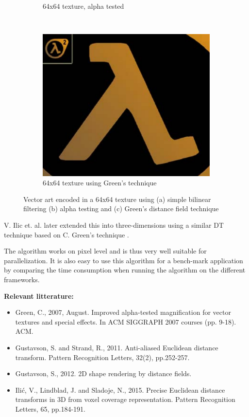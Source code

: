 \documentclass{article}
\begin{document}
\begin{figure}[!h]
\begin{subfigure}[b]{0.3\textwidth}
        \caption{64x64 texture, alpha tested}
        \label{fig:valveA}
    \end{subfigure}
    ~ 
    \begin{subfigure}[b]{0.3\textwidth}
        \includegraphics[width=\textwidth]{Figs/ValveGreensTechnique.png}
        \caption{64x64 texture using Green's technique}
        \label{fig:mouse}
    \end{subfigure}
    \caption{Vector art encoded in a 64x64 texture using (a) simple bilinear filtering (b) alpha testing and (c) Green's distance field technique}\label{fig:animals}
    \label{fig:valve}
\end{figure}

V. Ilic et. al. later extended this into three-dimensions using a similar DT technique based on C. Green's technique \cite{ilic2015precise}. 

The algorithm works on pixel level and is thus very well suitable for parallelization. It is also easy to use this algorithm for a bench-mark application by comparing the time consumption when running the algorithm on the different frameworks.


\vspace{5mm}
\noindent \textbf{Relevant litterature:}
\begin{itemize}
    \item Green, C., 2007, August. Improved alpha-tested magnification for vector textures and special effects. In ACM SIGGRAPH 2007 courses (pp. 9-18). ACM. \cite{green2007improved}
    \item Gustavson, S. and Strand, R., 2011. Anti-aliased Euclidean distance transform. Pattern Recognition Letters, 32(2), pp.252-257. \cite{gustavson2011anti}
    \item Gustavson, S., 2012. 2D shape rendering by distance fields. \cite{gustavson20122d}
    \item Ilić, V., Lindblad, J. and Sladoje, N., 2015. Precise Euclidean distance transforms in 3D from voxel coverage representation. Pattern Recognition Letters, 65, pp.184-191. \cite{ilic2015precise}
\end{itemize}
\end{document}
